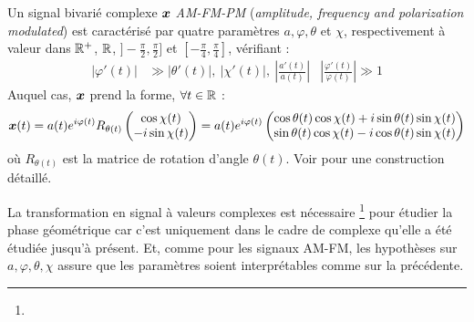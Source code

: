 \begin{definition}[Signal AM-FM-PM] \label{def:AM-FM-PM}
	Un signal bivarié complexe $\boldsymbol{x}$ \emph{AM-FM-PM} (\emph{amplitude, frequency and polarization modulated}) est caractérisé par quatre paramètres $a,\varphi,\theta$ et $\chi$, respectivement à valeur dans $\mathbb{R}^+$, $\mathbb{R}$, $]-\frac{\pi}{2}, \frac{\pi}{2}]$ et $[-\frac{\pi}{4}, \frac{\pi}{4}]$, vérifiant :
	\begin{align}\label{eq:condi_AM-FM-PM}
		\big| \varphi'(t) \big| &\gg \big| \theta'(t) \big| ,\ \big| \chi'(t) \big| ,\ \left| \frac{a'(t)}{a(t)}\right|  &  \left| \frac{\varphi'(t)}{\varphi(t)}\right| \gg 1
	\end{align}
	Auquel cas, $\boldsymbol{x}$ prend la forme, $\forall t\in\mathbb{R}$ :
	\begin{equation}\label{eq:AM-FM-PM}
		\boldsymbol{x}(t) = a(t)e^{i\varphi(t)} R_{\theta(t)} \begin{pmatrix} \cos\chi(t) \\ -i\sin\chi(t) \end{pmatrix} 
		= a(t)e^{i\varphi(t)} \begin{pmatrix} \cos\theta(t) \cos\chi(t) + i\sin\theta(t) \sin\chi(t) \\ \sin\theta(t) \cos\chi(t) - i\cos\theta(t) \sin\chi(t) \end{pmatrix}
	\end{equation}
	où $R_{\theta(t)}$ est la matrice de rotation d'angle $\theta(t)$. Voir \cite[ann. 4.B]{flamant_approche_2018} pour une construction détaillé.
\end{definition}
\skipl

La transformation en signal à valeurs complexes est nécessaire \footnote{
	}
pour étudier la phase géométrique car c'est uniquement dans le cadre de complexe qu'elle a été étudiée jusqu'à présent. 
Et, comme pour les signaux AM-FM, les hypothèses sur $a,\varphi,\theta,\chi$ assure que les paramètres soient interprétables comme sur la  précédente.
\\

